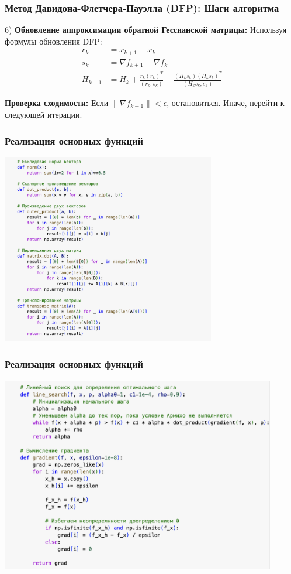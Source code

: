 \documentclass[12pt,pdf,hyperref={unicode}]{beamer}
\begin{document}
\begin{frame}
\frametitle{Метод Давидона-Флетчера-Пауэлла (DFP): Шаги алгоритма}
6) \textbf{Обновление аппроксимации обратной Гессианской матрицы:} Используя формулы обновления DFP:
    \begin{align*}
        r_k &= x_{k+1} - x_k \\
        s_k &= \nabla f_{k+1} - \nabla f_k \\
H_{k+1} &= H_k + \frac{r_k(r_k)^T}{(r_k, s_k)} - \frac{(H_ks_k)(H_ks_k)^T}{(H_ks_k, s_k)}
    \end{align*}
    
    \item \textbf{Проверка сходимости:} Если $\|\nabla f_{k+1}\| < \epsilon$, остановиться. Иначе, перейти к следующей итерации.
\end{frame}


\begin{frame}
\frametitle{Реализация основных функций}
\begin{center}
    \includegraphics[width=0.7\textwidth]{image1.png}
\end{center}
\end{frame}

\begin{frame}
\frametitle{Реализация основных функций}
\begin{center}
    \includegraphics[width=0.9\textwidth]{image2.png}
\end{center}
\end{frame}
\end{document}
